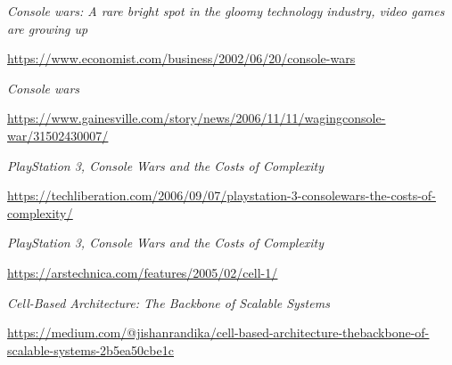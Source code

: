 \documentclass[10pt,compsoc]{IEEEtran}
\begin{document}
\begin{thebibliography}{1}
			{\it{Console wars: A rare bright spot in the gloomy technology industry, video games are growing up}}
			 
			\href{https://www.economist.com/business/2002/06/20/console-wars}{\uline{https://www.economist.com/business/2002/06/20/console-wars}}\newline

			{\it{Console wars}}
			
			\href{https://www.gainesville.com/story/news/2006/11/11/waging-console-war/31502430007/}{\uline{https://www.gainesville.com/story/news/2006/11/11/waging\-console-war/31502430007/}}\newline
			
			{\it{PlayStation 3, Console Wars and the Costs of Complexity}}
				
			\href{https://techliberation.com/2006/09/07/playstation-3-console-wars-the-costs-of-complexity/}{\uline{https://techliberation.com/2006/09/07/playstation-3-console\-wars-the-costs-of-complexity/}}\newline
			
			
			{\it{PlayStation 3, Console Wars and the Costs of Complexity}}
					
			
			\href{https://arstechnica.com/features/2005/02/cell-1/}{\uline{https://arstechnica.com/features/2005/02/cell-1/}}\newline
			
			
			
			{\it{Cell-Based Architecture: The Backbone of Scalable Systems}}
			 
			\href{https://medium.com/@jishanrandika/cell-based-architecture-the-backbone-of-scalable-systems-2b5ea50cbe1c}{\uline{https://medium.com/@jishanrandika/cell-based-architecture-the\-backbone-of-scalable-systems-2b5ea50cbe1c}}	
		
		
		\end{thebibliography}
		
			
	
		
\end{document}
